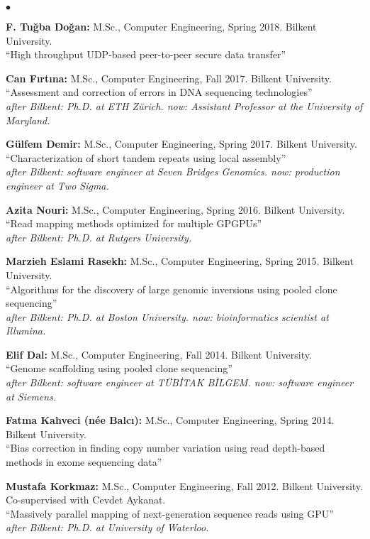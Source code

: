\documentclass[margin,line]{res}
\newenvironment{list2}{
  \begin{list}{$\bullet$}{%
      \setlength{\itemsep}{0.1cm}
      \setlength{\parsep}{0in} \setlength{\parskip}{0in}
      \setlength{\topsep}{0in} \setlength{\partopsep}{0in} 
      \setlength{\leftmargin}{0.2in}}}{\end{list}}
\begin{document}
\begin{resume}
\begin{list2}
\item
  {\bf F. Tuğba Doğan:} M.Sc., Computer Engineering, Spring 2018.
  Bilkent University. \\
  ``High throughput UDP-based peer-to-peer secure data transfer''
\item
  {\bf Can Fırtına:} M.Sc., Computer Engineering,  Fall 2017.
  Bilkent University. \\
  ``Assessment and correction of errors in DNA sequencing technologies''\\
  {\it after Bilkent: Ph.D. at ETH Zürich. now: Assistant Professor at the University of Maryland.}
\item
  {\bf Gülfem Demir:} M.Sc., Computer Engineering, Spring 2017.
  Bilkent University. \\
  ``Characterization of short tandem repeats using local assembly''\\
  {\it after Bilkent: software engineer at Seven Bridges Genomics. now: production engineer at Two Sigma.}
\item
  {\bf Azita Nouri:} M.Sc., Computer Engineering, Spring 2016.
  Bilkent University.\\
  ``Read mapping methods optimized for multiple GPGPUs''\\
  {\it after Bilkent: Ph.D. at Rutgers University.}
\item
  {\bf Marzieh Eslami Rasekh:} M.Sc., Computer Engineering, Spring 2015.
  Bilkent University.\\
  ``Algorithms for the discovery of large genomic inversions using pooled clone sequencing''\\
  {\it after Bilkent: Ph.D. at Boston University. now: bioinformatics scientist at Illumina.}
\item
  {\bf Elif Dal:} M.Sc., Computer Engineering, Fall 2014.
  Bilkent University.\\
  ``Genome scaffolding using pooled clone sequencing''\\
  {\it after Bilkent: software engineer at TÜBİTAK BİLGEM. now: software engineer at Siemens.}

\item
  {\bf Fatma Kahveci (n\'{e}e Balc{\i}):} M.Sc., Computer Engineering, Spring 2014.
  Bilkent University.\\
  ``Bias correction in finding copy number variation using read depth-based methods in exome sequencing data''
\item
 {\bf Mustafa Korkmaz:} M.Sc., Computer Engineering, Fall 2012.
  Bilkent University. \\ Co-supervised with Cevdet Aykanat.\\
  ``Massively parallel mapping of next-generation sequence reads using GPU''\\
  {\it after Bilkent: Ph.D. at University of Waterloo.}
\end{list2}
\vspace*{-.4cm}

\end{resume}
\end{document}
